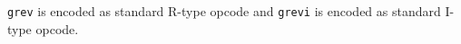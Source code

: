 

\texttt{grev} is encoded as standard R-type opcode and \texttt{grevi} is
encoded as standard I-type opcode.

%
%
%
%
%
%
%
%
%
%
%
%
%
%
%
%
%

